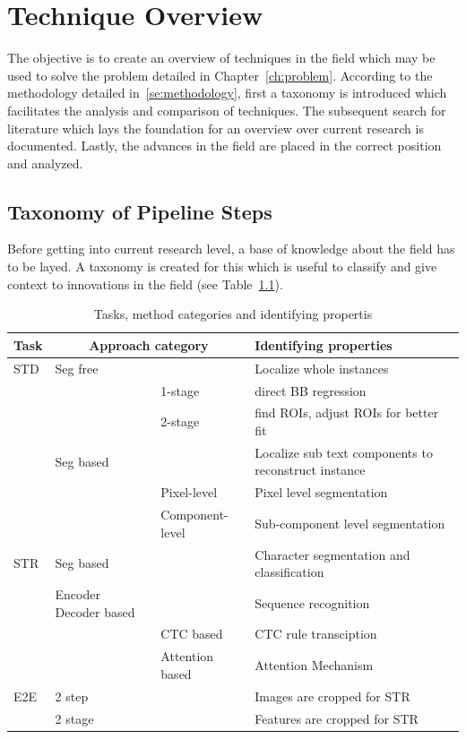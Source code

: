 \chapter{Technique Overview}\label{ch:research}
The objective is to create an overview of techniques in the field which may be used to solve the
problem detailed in Chapter~\ref{ch:problem}.
According to the methodology detailed in~\ref{se:methodology}, first a taxonomy is introduced
which facilitates the analysis and comparison of techniques.
The subsequent search for literature which lays the foundation for an overview over current research
is documented.
Lastly, the advances in the field are placed in the correct position and analyzed.

\section{Taxonomy of Pipeline Steps}
Before getting into current research level, a base of knowledge about the field has to be layed.
A taxonomy is created for this which is useful to classify and give context to innovations in the
field (see Table~\ref{tb:steps-properties}).
\begin{table}[ht]
    \centering\scriptsize
    \begin{tabular}{p{}p{}p{}p{}}
        Task & \multicolumn{2}{c}{Approach category} & Identifying properties \\
        \toprule
        STD & Seg free & & Localize whole instances  \\
            & & 1-stage & direct \ac{BB} regression \\
            & & 2-stage & find \acp{ROI}, adjust \acp{ROI} for better fit \\
            & Seg based & & Localize sub text components to reconstruct instance \\
            & & Pixel-level & Pixel level segmentation \\
            & & Component-level & Sub-component level segmentation \\
        \midrule
        STR & Seg based & & Character segmentation and classification\\
            & Encoder Decoder based & & Sequence recognition \\
            & & CTC based & CTC rule transciption \\
            & & Attention based & Attention Mechanism \\
        \midrule
        E2E & 2 step & & Images are cropped for STR \\
            & 2 stage & & Features are cropped for STR \\
        \bottomrule
    \end{tabular}
    \caption{Tasks, method categories and identifying propertis\label{tb:steps-properties}}
\end{table}
